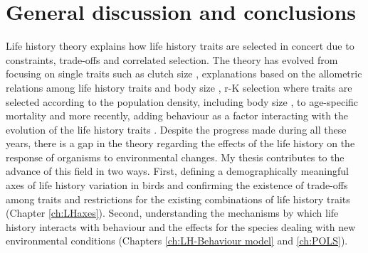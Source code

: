 \chapter{General discussion and conclusions}\label{ch:discussion}

Life history theory explains how life history traits are selected in concert
due to constraints, trade-offs and correlated selection. The theory has evolved
from focusing on single traits such as clutch size \citep{Lack1946,Skutch1949},
explanations based on the allometric relations among life history traits and
body size \citep{Western1979}, r-K selection where traits are selected
according to the population density, including body size \citep{Pianka1970}, to
age-specific mortality \citep{Gadgil1970,Stearns1976,Charlesworth1980} and
more recently, adding behaviour as a factor interacting with the evolution
of the life history traits \citep{Ricklefs2002,Reale2010a,Sol2016}.
Despite the progress made during all these years, there is a gap in the theory
regarding the effects of the life history on the response of organisms to
environmental changes.
My thesis contributes to the advance of this field in two ways.
First, defining a demographically meaningful axes of life history variation in
birds and confirming the existence of trade-offs among traits and restrictions
for the existing combinations of life history traits (Chapter \ref{ch:LHaxes}).
Second, understanding the mechanisms by which life history interacts with
behaviour and the effects for the species dealing with new environmental
conditions (Chapters \ref{ch:LH-Behaviour model} and \ref{ch:POLS}).

\bigskip

